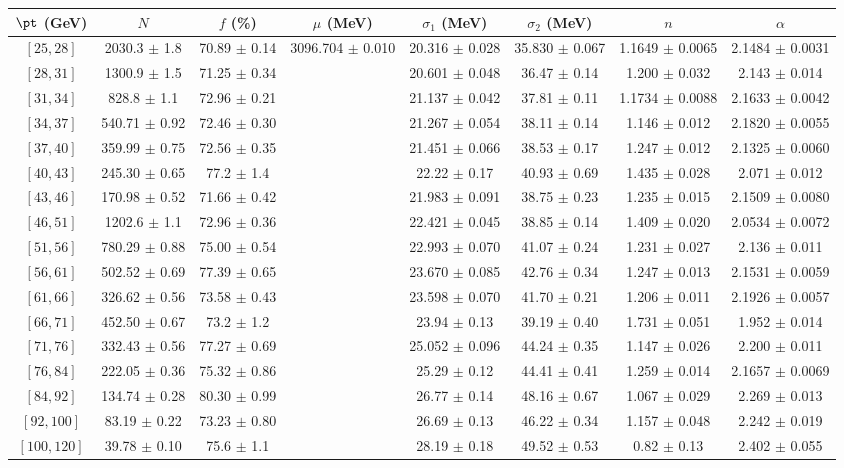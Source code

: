 \begin{tabular}{c||c|c|c|c|c|c|c}
$\pt$ (GeV) & $N$ & $f$ (\%) & $\mu$ (MeV) & $\sigma_1$ (MeV) & $\sigma_2$ (MeV) & $n$ & $\alpha$ \\
\hline
$[25, 28]$ & 2030.3 $\pm$ 1.8 & 70.89 $\pm$ 0.14 & \multirow{17}{*}{3096.704 $\pm$ 0.010} & 20.316 $\pm$ 0.028 & 35.830 $\pm$ 0.067 & 1.1649 $\pm$ 0.0065 & 2.1484 $\pm$ 0.0031\\
$[28, 31]$ & 1300.9 $\pm$ 1.5 & 71.25 $\pm$ 0.34 &  & 20.601 $\pm$ 0.048 & 36.47 $\pm$ 0.14 & 1.200 $\pm$ 0.032 & 2.143 $\pm$ 0.014\\
$[31, 34]$ & 828.8 $\pm$ 1.1 & 72.96 $\pm$ 0.21 &  & 21.137 $\pm$ 0.042 & 37.81 $\pm$ 0.11 & 1.1734 $\pm$ 0.0088 & 2.1633 $\pm$ 0.0042\\
$[34, 37]$ & 540.71 $\pm$ 0.92 & 72.46 $\pm$ 0.30 &  & 21.267 $\pm$ 0.054 & 38.11 $\pm$ 0.14 & 1.146 $\pm$ 0.012 & 2.1820 $\pm$ 0.0055\\
$[37, 40]$ & 359.99 $\pm$ 0.75 & 72.56 $\pm$ 0.35 &  & 21.451 $\pm$ 0.066 & 38.53 $\pm$ 0.17 & 1.247 $\pm$ 0.012 & 2.1325 $\pm$ 0.0060\\
$[40, 43]$ & 245.30 $\pm$ 0.65 & 77.2 $\pm$ 1.4 &  & 22.22 $\pm$ 0.17 & 40.93 $\pm$ 0.69 & 1.435 $\pm$ 0.028 & 2.071 $\pm$ 0.012\\
$[43, 46]$ & 170.98 $\pm$ 0.52 & 71.66 $\pm$ 0.42 &  & 21.983 $\pm$ 0.091 & 38.75 $\pm$ 0.23 & 1.235 $\pm$ 0.015 & 2.1509 $\pm$ 0.0080\\
$[46, 51]$ & 1202.6 $\pm$ 1.1 & 72.96 $\pm$ 0.36 &  & 22.421 $\pm$ 0.045 & 38.85 $\pm$ 0.14 & 1.409 $\pm$ 0.020 & 2.0534 $\pm$ 0.0072\\
$[51, 56]$ & 780.29 $\pm$ 0.88 & 75.00 $\pm$ 0.54 &  & 22.993 $\pm$ 0.070 & 41.07 $\pm$ 0.24 & 1.231 $\pm$ 0.027 & 2.136 $\pm$ 0.011\\
$[56, 61]$ & 502.52 $\pm$ 0.69 & 77.39 $\pm$ 0.65 &  & 23.670 $\pm$ 0.085 & 42.76 $\pm$ 0.34 & 1.247 $\pm$ 0.013 & 2.1531 $\pm$ 0.0059\\
$[61, 66]$ & 326.62 $\pm$ 0.56 & 73.58 $\pm$ 0.43 &  & 23.598 $\pm$ 0.070 & 41.70 $\pm$ 0.21 & 1.206 $\pm$ 0.011 & 2.1926 $\pm$ 0.0057\\
$[66, 71]$ & 452.50 $\pm$ 0.67 & 73.2 $\pm$ 1.2 &  & 23.94 $\pm$ 0.13 & 39.19 $\pm$ 0.40 & 1.731 $\pm$ 0.051 & 1.952 $\pm$ 0.014\\
$[71, 76]$ & 332.43 $\pm$ 0.56 & 77.27 $\pm$ 0.69 &  & 25.052 $\pm$ 0.096 & 44.24 $\pm$ 0.35 & 1.147 $\pm$ 0.026 & 2.200 $\pm$ 0.011\\
$[76, 84]$ & 222.05 $\pm$ 0.36 & 75.32 $\pm$ 0.86 &  & 25.29 $\pm$ 0.12 & 44.41 $\pm$ 0.41 & 1.259 $\pm$ 0.014 & 2.1657 $\pm$ 0.0069\\
$[84, 92]$ & 134.74 $\pm$ 0.28 & 80.30 $\pm$ 0.99 &  & 26.77 $\pm$ 0.14 & 48.16 $\pm$ 0.67 & 1.067 $\pm$ 0.029 & 2.269 $\pm$ 0.013\\
$[92, 100]$ & 83.19 $\pm$ 0.22 & 73.23 $\pm$ 0.80 &  & 26.69 $\pm$ 0.13 & 46.22 $\pm$ 0.34 & 1.157 $\pm$ 0.048 & 2.242 $\pm$ 0.019\\
$[100, 120]$ & 39.78 $\pm$ 0.10 & 75.6 $\pm$ 1.1 &  & 28.19 $\pm$ 0.18 & 49.52 $\pm$ 0.53 & 0.82 $\pm$ 0.13 & 2.402 $\pm$ 0.055\\
\end{tabular}
